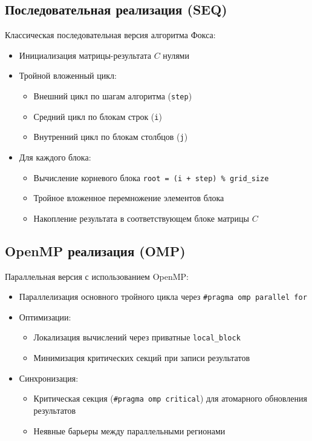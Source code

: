 \documentclass[12pt]{article}
\begin{document}
\subsection{Последовательная реализация (SEQ)}
Классическая последовательная версия алгоритма Фокса:
\begin{itemize}
    \item Инициализация матрицы-результата $C$ нулями
    \item Тройной вложенный цикл:
    \begin{itemize}
        \item Внешний цикл по шагам алгоритма (\texttt{step})
        \item Средний цикл по блокам строк (\texttt{i})
        \item Внутренний цикл по блокам столбцов (\texttt{j})
    \end{itemize}
    \item Для каждого блока:
    \begin{itemize}
        \item Вычисление корневого блока \texttt{root = (i + step) \% grid\_size}
        \item Тройное вложенное перемножение элементов блока
        \item Накопление результата в соответствующем блоке матрицы $C$
    \end{itemize}
\end{itemize}

\subsection{OpenMP реализация (OMP)}
Параллельная версия с использованием OpenMP:
\begin{itemize}
    \item Параллелизация основного тройного цикла через \texttt{\#pragma omp parallel for}
    \item Оптимизации:
    \begin{itemize}
        \item Локализация вычислений через приватные \texttt{local\_block}
        \item Минимизация критических секций при записи результатов
    \end{itemize}
    \item Синхронизация:
    \begin{itemize}
        \item Критическая секция (\texttt{\#pragma omp critical}) для атомарного обновления результатов
        \item Неявные барьеры между параллельными регионами
    \end{itemize}
\end{itemize}
\end{document}
